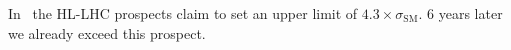 In~\cite{ATL-PHYS-PUB-2015-046} the HL-LHC prospects claim to set an
upper limit of $4.3 \times \sigma_\text{SM}$. 6 years later we already
exceed this prospect.


